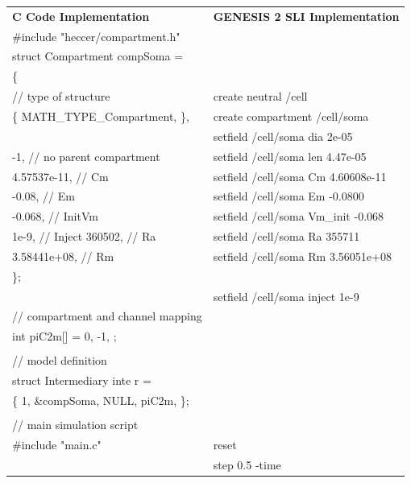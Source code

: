 \documentclass[12pt]{article}
\begin{document}
\begin{tabular}{ l l }
    {\bf C Code Implementation} & {\bf GENESIS 2 SLI Implementation} \\
\#include "heccer/compartment.h" & \\
struct Compartment compSoma = & \\
\{ & \\
 // type of structure & create neutral /cell \\
 \{ MATH\_TYPE\_Compartment, \}, & create compartment /cell/soma \\
 & setfield /cell/soma dia 2e-05 \\
 -1,  // no parent compartment & setfield /cell/soma len 4.47e-05 \\
 4.57537e-11, // Cm & setfield /cell/soma Cm 4.60608e-11 \\
 -0.08,       // Em & setfield /cell/soma Em -0.0800 \\
 -0.068,      // InitVm & setfield /cell/soma Vm\_init -0.068 \\
 1e-9,        // Inject
 360502,      // Ra & setfield /cell/soma Ra 355711 \\
 3.58441e+08, // Rm & setfield /cell/soma Rm 3.56051e+08 \\
\}; & \\
 & setfield /cell/soma inject 1e-9 \\
//  compartment and channel mapping & \\
int piC2m[] = { 0, -1, }; & \\
 & \\
// model definition & \\
struct Intermediary inte r = & \\
\{ 1, \&compSoma, NULL, piC2m, \}; & \\
 & \\
// main simulation script & \\
\#include "main.c" & reset \\
 & step 0.5 -time \\
\end{tabular}
\end{document}

